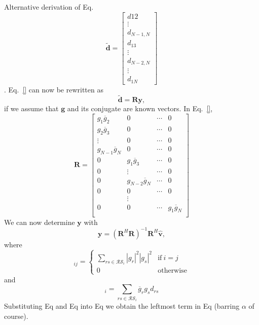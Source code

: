 \documentclass[a4paper,10pt]{article}
\newcommand{\conj}[1]{\overline{#1}}
\begin{document}
\begin{section}{Alternative derivation of Eq.}
\begin{equation}
\widetilde{\boldsymbol{d}} = 
\begin{bmatrix} 
d{12}\\
\vdots\\
d_{N-1,N}\\
d_{13}\\
\vdots\\
d_{N-2,N}\\
\vdots\\
d_{1N}
\end{bmatrix} 
\end{equation}.
Eq.~\eqref{} can now be rewritten as 
\begin{equation}
\widetilde{\boldsymbol{d}} = \boldsymbol{R}\boldsymbol{y}, 
\end{equation}
if we assume that $\boldsymbol{g}$ and its conjugate are known vectors. In Eq.~\eqref{},
\begin{equation}
\boldsymbol{R} = 
\begin{bmatrix}
g_1\conj{g}_2 & 0 & \cdots & 0\\
g_2\conj{g}_3 & 0 & \cdots & 0\\
\vdots & 0 & \cdots & 0\\
g_{N-1}\conj{g}_N & 0 & \cdots & 0\\
0 & g_1\conj{g}_3 & \cdots & 0\\
0 & \vdots & \cdots & 0\\
0 & g_{N-2}\conj{g}_N & \cdots & 0\\
0 & 0 & \cdots & 0\\
  & \vdots & \\
0 & 0 & \cdots & g_1\conj{g}_N\\  
\end{bmatrix}
\end{equation}
We can now determine $\boldsymbol{y}$ with
\begin{equation}
\boldsymbol{y} = (\boldsymbol{R}^H\boldsymbol{R})^{-1}\boldsymbol{R}^H\widehat{\boldsymbol{v}}, 
\end{equation}
where 
\begin{equation}
[\boldsymbol{R}^H\boldsymbol{R}]_{ij} = 
\begin{cases}
\sum_{rs\in\mathcal{RS}_i} |g_r|^2|g_s|^2 &\textrm{if}~i=j\\
0&\textrm{otherwise}
\end{cases}
\end{equation}
and
\begin{equation}
[\boldsymbol{R}^H\widehat{\boldsymbol{v}}]_i = \sum_{rs\in\mathcal{RS}_i} \conj{g}_r g_s d_{rs} 
\end{equation}
Substituting Eq and Eq into Eq we obtain
the leftmost term in Eq (barring $\alpha$ of course).  
\end{section}
\end{document}
